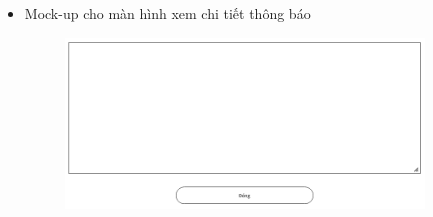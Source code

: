 \documentclass{article}
\begin{document}
\begin{itemize}
    \item Mock-up cho màn hình xem chi tiết thông báo
    \begin{figure}[H]
        \centering
        \includegraphics[width=0.9\textwidth]{Ảnh chương 4/Màn hình xem chi tiết thông báo.png}
    \end{figure}
\end{itemize}
\newpage
\end{document}

